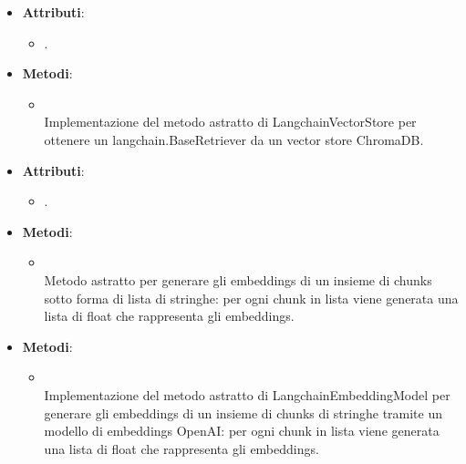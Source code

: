 \documentclass[10pt, a4paper]{article}
\begin{document}
\label{ChromaDBVectorStoreDettaglio}
\begin{itemize}
    \item \textbf{Attributi}:
    \begin{itemize}
        \item {}.
    \end{itemize}
    \item \textbf{Metodi}:
    \begin{itemize}
        \item {}\\
        Implementazione del metodo astratto di LangchainVectorStore per ottenere un langchain.BaseRetriever da un vector store ChromaDB.
    \end{itemize}
\end{itemize}

\label{LangchainEmbeddingModelDettaglio}
\begin{itemize}
    \item \textbf{Attributi}:
    \begin{itemize}
        \item {}.
    \end{itemize}
    \item \textbf{Metodi}:
    \begin{itemize}
        \item {}\\
        Metodo astratto per generare gli embeddings di un insieme di chunks sotto forma di lista di stringhe: per ogni chunk in lista viene generata una lista di float che rappresenta gli embeddings.
    \end{itemize}
\end{itemize}

\label{OpenAIEmbeddingModelDettaglio}
\begin{itemize}
    \item \textbf{Metodi}:
    \begin{itemize}
        \item {}\\
        Implementazione del metodo astratto di LangchainEmbeddingModel per generare gli embeddings di un insieme di chunks di stringhe tramite un modello di embeddings OpenAI: per ogni chunk in lista viene generata una lista di float che rappresenta gli embeddings.
    \end{itemize}
\end{itemize}
\end{document}
